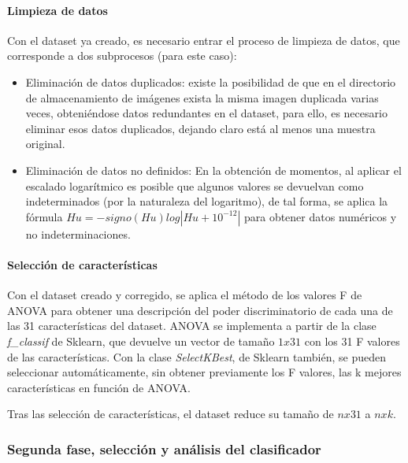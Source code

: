 
\paragraph{Limpieza de datos}

Con el dataset ya creado, es necesario entrar el proceso de limpieza de datos, que corresponde a dos subprocesos (para este caso):

\begin{itemize}
	\item Eliminación de datos duplicados: existe la posibilidad de que en el directorio de almacenamiento de imágenes exista la misma imagen duplicada varias veces, obteniéndose datos redundantes en el dataset, para ello, es necesario eliminar esos datos duplicados, dejando claro está al menos una muestra original.
	\item Eliminación de datos no definidos: En la obtención de momentos, al aplicar el escalado logarítmico es posible que algunos valores se devuelvan como indeterminados (por la naturaleza del logaritmo), de tal forma, se aplica la fórmula $Hu = -signo(Hu)log|Hu+10^{-12}|$ para obtener datos numéricos y no indeterminaciones.
\end{itemize}

\paragraph{Selección de características}

Con el dataset creado y corregido, se aplica el método de los valores F de ANOVA para obtener una descripción del poder discriminatorio de cada una de las 31 características del dataset. ANOVA se implementa a partir de la clase \textit{f\_classif} de Sklearn\cite{scikit-learn}, que devuelve un vector de tamaño $1x31$ con los 31 F valores de las características. Con la clase \textit{SelectKBest}, de Sklearn\cite{scikit-learn} también, se pueden seleccionar automáticamente, sin obtener previamente los F valores, las k mejores características en función de ANOVA.

Tras las selección de características, el dataset reduce su tamaño de $nx31$ a $nxk$.

\subsubsection{Segunda fase, selección y análisis del clasificador}

